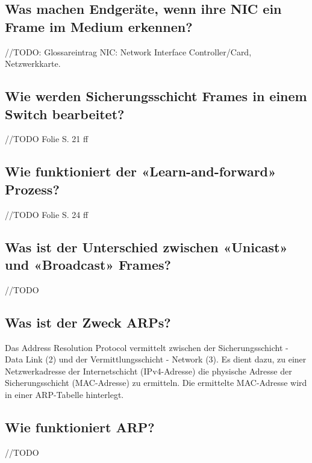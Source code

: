 \subsection*{Was machen Endgeräte, wenn ihre NIC ein Frame im Medium erkennen?}
//TODO: Glossareintrag NIC: Network Interface Controller/Card, Netzwerkkarte.\\


\subsection*{Wie werden Sicherungsschicht Frames in einem Switch bearbeitet? }
//TODO Folie S. 21 ff

\subsection*{Wie funktioniert der «Learn-and-forward» Prozess?}
//TODO Folie S. 24 ff

\subsection*{Was ist der Unterschied zwischen «Unicast» und «Broadcast» Frames?}
//TODO

\subsection*{Was ist der Zweck ARPs?}
Das Address Resolution Protocol vermittelt zwischen der Sicherungsschicht - Data Link (2) und der Vermittlungsschicht - Network (3). Es dient dazu, zu einer Netzwerkadresse der Internetschicht (IPv4-Adresse) die physische Adresse der Sicherungsschicht (MAC-Adresse) zu ermitteln. Die ermittelte MAC-Adresse wird in einer ARP-Tabelle hinterlegt.

\subsection*{Wie funktioniert ARP?}
//TODO
